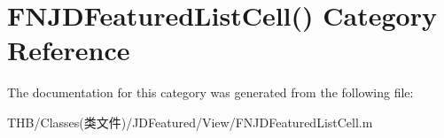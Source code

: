 \hypertarget{category_f_n_j_d_featured_list_cell_07_08}{}\section{F\+N\+J\+D\+Featured\+List\+Cell() Category Reference}
\label{category_f_n_j_d_featured_list_cell_07_08}


The documentation for this category was generated from the following file\+:\begin{DoxyCompactItemize}
\item 
T\+H\+B/\+Classes(类文件)/\+J\+D\+Featured/\+View/F\+N\+J\+D\+Featured\+List\+Cell.\+m\end{DoxyCompactItemize}
